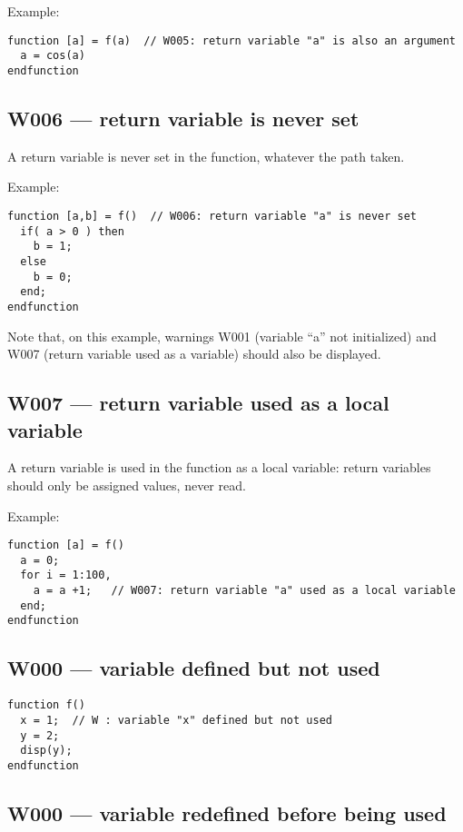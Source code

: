Example:\begin{verbatim}
function [a] = f(a)  // W005: return variable "a" is also an argument
  a = cos(a)
endfunction
\end{verbatim}




\subsection{W006 --- return variable is never set}




A return variable is never set in the function, whatever the path taken.



Example:\begin{verbatim}
function [a,b] = f()  // W006: return variable "a" is never set
  if( a > 0 ) then
    b = 1;
  else
    b = 0;
  end;
endfunction
\end{verbatim}
Note that, on this example, warnings W001 (variable ``a'' not initialized)
and W007 (return variable used as a variable) should also be displayed.



\subsection{W007 --- return variable used as a local variable}




A return variable is used in the function as a local variable: return
variables should only be assigned values, never read.



Example:\begin{verbatim}
function [a] = f()
  a = 0;
  for i = 1:100,
    a = a +1;   // W007: return variable "a" used as a local variable
  end;
endfunction
\end{verbatim}




\subsection{W000 --- variable defined but not used}


\begin{verbatim}
function f()
  x = 1;  // W : variable "x" defined but not used
  y = 2;
  disp(y);
endfunction
\end{verbatim}


\subsection{W000 --- variable redefined before being used}


